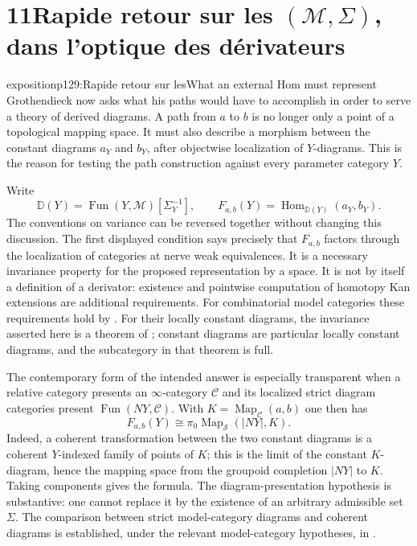 \section*{11\quad Rapide retour sur les $(\mathcal{M},\Sigma)$, dans l'optique des dérivateurs}

\begin{dcomment}{exposition}{p129:Rapide retour sur les}{What an external Hom must represent}
Grothendieck now asks what his paths would have to accomplish in order to serve a theory of derived diagrams. A path from $a$ to $b$ is no longer only a point of a topological mapping space. It must also describe a morphism between the constant diagrams $a_Y$ and $b_Y$, after objectwise localization of $Y$-diagrams. This is the reason for testing the path construction against every parameter category $Y$.

Write
\[
 \mathbb D(Y)=\operatorname{Fun}(Y,\mathcal M)[\Sigma_Y^{-1}],
 \qquad
 F_{a,b}(Y)=\operatorname{Hom}_{\mathbb D(Y)}(a_Y,b_Y).
\]
The conventions on variance can be reversed together without changing this discussion. The first displayed condition says precisely that $F_{a,b}$ factors through the localization of categories at nerve weak equivalences. It is a necessary invariance property for the proposed representation by a space. It is not by itself a definition of a derivator: existence and pointwise computation of homotopy Kan extensions are additional requirements. For combinatorial model categories these requirements hold by \citet[Proposition~1.30]{Groth2013}. For their locally constant diagrams, the invariance asserted here is a theorem of \citet[Theorem~1.3]{Cisinski2009LocallyConstant}; constant diagrams are particular locally constant diagrams, and the subcategory in that theorem is full.

The contemporary form of the intended answer is especially transparent when a relative category presents an $\infty$-category $\mathcal C$ and its localized strict diagram categories present $\operatorname{Fun}(NY,\mathcal C)$. With $K=\operatorname{Map}_{\mathcal C}(a,b)$ one then has
\[
 F_{a,b}(Y)\cong
 \pi_0\operatorname{Map}_{\mathcal S}(|NY|,K).
\]
Indeed, a coherent transformation between the two constant diagrams is a coherent $Y$-indexed family of points of $K$; this is the limit of the constant $K$-diagram, hence the mapping space from the groupoid completion $|NY|$ to $K$. Taking components gives the formula. The diagram-presentation hypothesis is substantive: one cannot replace it by the existence of an arbitrary admissible set $\Sigma$. The comparison between strict model-category diagrams and coherent diagrams is established, under the relevant model-category hypotheses, in \citet[Proposition~4.2.4.4]{Lurie2009HTT}.


\end{dcomment}
